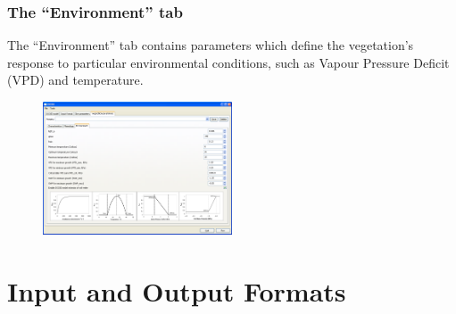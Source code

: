 \documentclass[10pt,a4paper]{article}
\begin{document}
\subsubsection{The ``Environment'' tab}

The ``Environment'' tab contains parameters which define the vegetation's response to particular 
environmental conditions, such as Vapour Pressure Deficit (VPD) and temperature.

\begin{figure}[!htb]
\centering
\includegraphics[width=0.5\textwidth]{images/ss/veg-environment-panel}
\end{figure}


\section{Input and Output Formats}
\label{sec:io-formats}
\end{document}
